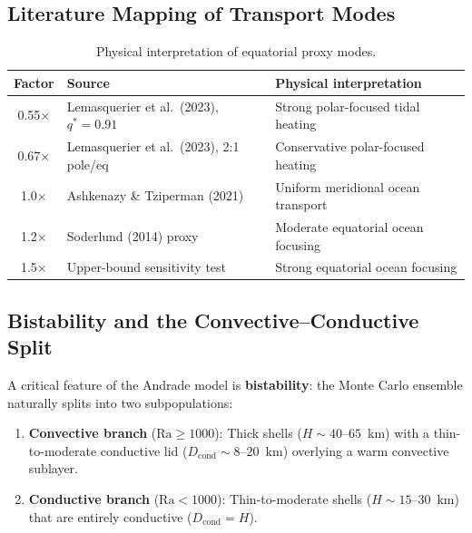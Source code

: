 \documentclass[11pt,letterpaper]{article}
\begin{document}
\subsection{Literature Mapping of Transport Modes}

\begin{table}[htbp]
\centering
\caption{Physical interpretation of equatorial proxy modes.}
\label{tab:literature_map}
\begin{tabular}{@{}cll@{}}
\toprule
\textbf{Factor} & \textbf{Source} & \textbf{Physical interpretation} \\
\midrule
0.55$\times$ & Lemasquerier et al.\ (2023), $q^* = 0.91$ & Strong polar-focused tidal heating \\
0.67$\times$ & Lemasquerier et al.\ (2023), 2:1 pole/eq & Conservative polar-focused heating \\
1.0$\times$ & Ashkenazy \& Tziperman (2021) & Uniform meridional ocean transport \\
1.2$\times$ & Soderlund (2014) proxy & Moderate equatorial ocean focusing \\
1.5$\times$ & Upper-bound sensitivity test & Strong equatorial ocean focusing \\
\bottomrule
\end{tabular}
\end{table}

\subsection{Bistability and the Convective--Conductive Split}

A critical feature of the Andrade model is \textbf{bistability}: the Monte Carlo ensemble naturally splits into two subpopulations:

\begin{enumerate}[nosep]
  \item \textbf{Convective branch} ($\mathrm{Ra} \geq 1000$): Thick shells ($H \sim 40$--$65$~km) with a thin-to-moderate conductive lid ($D_\mathrm{cond} \sim 8$--$20$~km) overlying a warm convective sublayer.
  \item \textbf{Conductive branch} ($\mathrm{Ra} < 1000$): Thin-to-moderate shells ($H \sim 15$--$30$~km) that are entirely conductive ($D_\mathrm{cond} = H$).
\end{enumerate}
\end{document}
